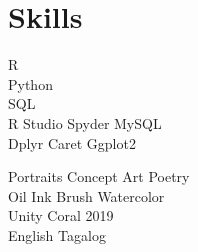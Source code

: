 \begin{minipage}[t]{0.33\textwidth}
\sectionspace %



\section{Skills}



R \\ 
Python \\
SQL \\
\textbullet{} R Studio  \textbullet{} Spyder \textbullet{} MySQL\\
\textbullet{} Dplyr  \textbullet{} Caret \textbullet{} Ggplot2\\
\sectionspace %

\sectionspace %

Portraits \textbullet{} Concept Art \textbullet{} Poetry\\
Oil \textbullet{} Ink Brush \textbullet{} Watercolor\\
Unity \textbullet{} Coral 2019 \\
English \textbullet{} Tagalog\\ 



\end{minipage} %
\hfill
%
%
